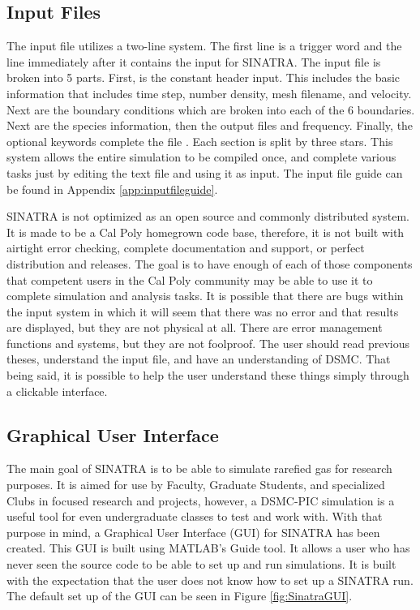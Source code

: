 \subsection{Input Files}
The input file utilizes a two-line system. The first line is a trigger word and the line immediately after it contains the input for SINATRA. The input file is broken into 5 parts. First, is the constant header input. This includes the basic information that includes time step, number density, mesh filename, and velocity. Next are the boundary conditions which are broken into each of the 6 boundaries. Next are the species information, then the output files and frequency. Finally, the optional keywords  complete the file . Each section is split by three stars. This system allows the entire simulation to be compiled once, and complete various tasks just by editing the text file and using it as input. The input file guide can be found in Appendix \ref{app:inputfileguide}. \par
\indent SINATRA is not optimized as an open source and commonly distributed system. It is made to be a Cal Poly homegrown code base, therefore, it is not built with airtight error checking, complete documentation and support, or perfect distribution and releases. The goal is to have enough of each of those components that competent users in the Cal Poly community may be able to use it to complete simulation and analysis tasks. It is possible that there are bugs within the input system in which it will seem that there was no error and that results are displayed, but they are not physical at all. There are error management functions and systems, but they are not foolproof. The user should read previous theses, understand the input file, and have an understanding of DSMC. That being said, it is possible to help the user understand these things simply through a clickable interface.

\subsection{Graphical User Interface}
The main goal of SINATRA is to be able to simulate rarefied gas for research purposes. It is aimed for use by Faculty, Graduate Students, and specialized Clubs in focused research and projects, however, a DSMC-PIC simulation is a useful tool for even undergraduate classes to test and work with. With that purpose in mind, a Graphical User Interface (GUI) for SINATRA has been created. This GUI is built using MATLAB’s Guide tool. It allows a user who has never seen the source code to be able to set up and run simulations. It is built with the expectation that the user does not know how to set up a SINATRA run. The default set up of the GUI can be seen in Figure \ref{fig:SinatraGUI}. \par

